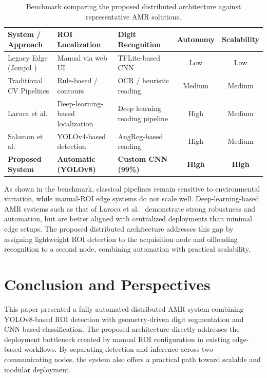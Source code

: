 \documentclass[11pt,a4paper]{article}
\begin{document}
\begin{table}[H]
\centering
\begin{tabular}{@{}p{3.8cm} p{3.8cm} p{3.6cm} c c@{}}
\toprule
\textbf{System / Approach} & \textbf{ROI Localization} & \textbf{Digit Recognition} & \textbf{Autonomy} & \textbf{Scalability} \\
\midrule
Legacy Edge (Jomjol \cite{jomjol}) & Manual via web UI & TFLite-based CNN & Low & Low \\
Traditional CV Pipelines & Rule-based / contours & OCR / heuristic reading & Medium & Medium \\
Laroca et al. \cite{laroca2021} & Deep-learning-based localization & Deep learning reading pipeline & High & Medium \\
Salomon et al. \cite{laroca2020dial} & YOLOv4-based detection & AngReg-based reading & High & Medium \\
\midrule
\textbf{Proposed System} & \textbf{Automatic (YOLOv8)} & \textbf{Custom CNN (99\%)} & \textbf{High} & \textbf{High} \\
\bottomrule
\end{tabular}
\caption{Benchmark comparing the proposed distributed architecture against representative AMR solutions.}
\label{tab:benchmark}
\end{table}

As shown in the benchmark, classical pipelines remain sensitive to environmental variation, while manual-ROI edge systems do not scale well. Deep-learning-based AMR systems such as that of Laroca et al.~\cite{laroca2021} demonstrate strong robustness and automation, but are better aligned with centralized deployments than minimal edge setups. The proposed distributed architecture addresses this gap by assigning lightweight ROI detection to the acquisition node and offloading recognition to a second node, combining automation with practical scalability.

\section{Conclusion and Perspectives}
This paper presented a fully automated distributed AMR system combining YOLOv8-based ROI detection with geometry-driven digit segmentation and CNN-based classification. The proposed architecture directly addresses the deployment bottleneck created by manual ROI configuration in existing edge-based workflows. By separating detection and inference across two communicating nodes, the system also offers a practical path toward scalable and modular deployment.
\end{document}
